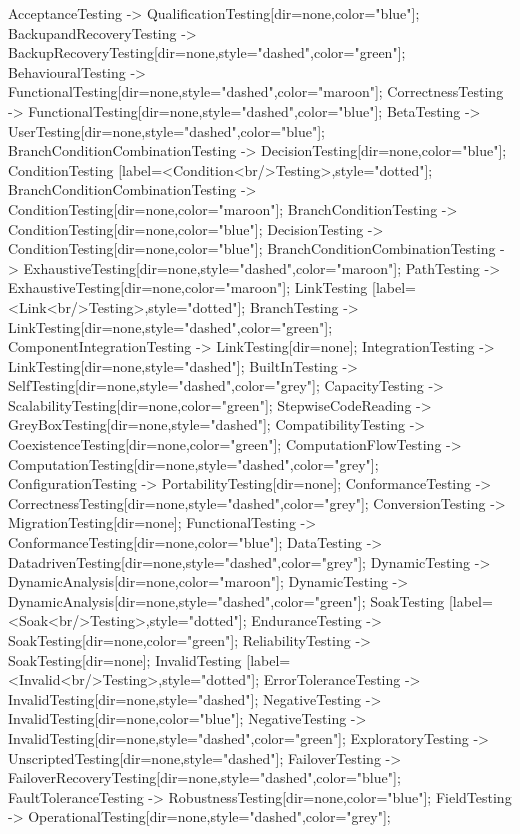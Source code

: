 \documentclass{article}
\begin{document}
{AcceptanceTesting -> QualificationTesting[dir=none,color="blue"];
BackupandRecoveryTesting -> BackupRecoveryTesting[dir=none,style="dashed",color="green"];
BehaviouralTesting -> FunctionalTesting[dir=none,style="dashed",color="maroon"];
CorrectnessTesting -> FunctionalTesting[dir=none,style="dashed",color="blue"];
BetaTesting -> UserTesting[dir=none,style="dashed",color="blue"];
BranchConditionCombinationTesting -> DecisionTesting[dir=none,color="blue"];
ConditionTesting [label=<Condition<br/>Testing>,style="dotted"];
BranchConditionCombinationTesting -> ConditionTesting[dir=none,color="maroon"];
BranchConditionTesting -> ConditionTesting[dir=none,color="blue"];
DecisionTesting -> ConditionTesting[dir=none,color="blue"];
BranchConditionCombinationTesting -> ExhaustiveTesting[dir=none,style="dashed",color="maroon"];
PathTesting -> ExhaustiveTesting[dir=none,color="maroon"];
LinkTesting [label=<Link<br/>Testing>,style="dotted"];
BranchTesting -> LinkTesting[dir=none,style="dashed",color="green"];
ComponentIntegrationTesting -> LinkTesting[dir=none];
IntegrationTesting -> LinkTesting[dir=none,style="dashed"];
BuiltInTesting -> SelfTesting[dir=none,style="dashed",color="grey"];
CapacityTesting -> ScalabilityTesting[dir=none,color="green"];
StepwiseCodeReading -> GreyBoxTesting[dir=none,style="dashed"];
CompatibilityTesting -> CoexistenceTesting[dir=none,color="green"];
ComputationFlowTesting -> ComputationTesting[dir=none,style="dashed",color="grey"];
ConfigurationTesting -> PortabilityTesting[dir=none];
ConformanceTesting -> CorrectnessTesting[dir=none,style="dashed",color="grey"];
ConversionTesting -> MigrationTesting[dir=none];
FunctionalTesting -> ConformanceTesting[dir=none,color="blue"];
DataTesting -> DatadrivenTesting[dir=none,style="dashed",color="grey"];
DynamicTesting -> DynamicAnalysis[dir=none,color="maroon"];
DynamicTesting -> DynamicAnalysis[dir=none,style="dashed",color="green"];
SoakTesting [label=<Soak<br/>Testing>,style="dotted"];
EnduranceTesting -> SoakTesting[dir=none,color="green"];
ReliabilityTesting -> SoakTesting[dir=none];
InvalidTesting [label=<Invalid<br/>Testing>,style="dotted"];
ErrorToleranceTesting -> InvalidTesting[dir=none,style="dashed"];
NegativeTesting -> InvalidTesting[dir=none,color="blue"];
NegativeTesting -> InvalidTesting[dir=none,style="dashed",color="green"];
ExploratoryTesting -> UnscriptedTesting[dir=none,style="dashed"];
FailoverTesting -> FailoverRecoveryTesting[dir=none,style="dashed",color="blue"];
FaultToleranceTesting -> RobustnessTesting[dir=none,color="blue"];
FieldTesting -> OperationalTesting[dir=none,style="dashed",color="grey"];
}
\end{document}
